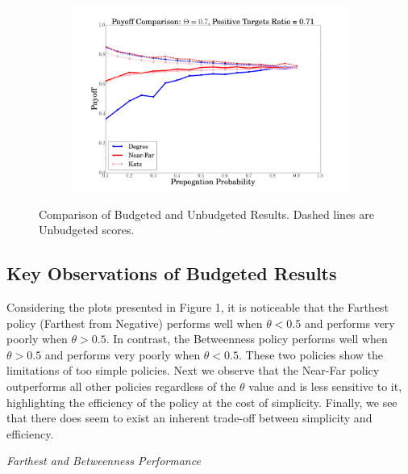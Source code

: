 \begin{figure}
\begin{subfigure}{\linewidth}
  \end{subfigure}\par\medskip
  \begin{subfigure}{\linewidth}
\includegraphics[width=1\textwidth]{../plots/comparison/theta=7.png}
  \end{subfigure}\par\medskip
  \caption{Comparison of Budgeted and Unbudgeted Results. Dashed lines are Unbudgeted scores.}
\end{figure}


\subsection{Key Observations of Budgeted Results}

Considering the plots presented in Figure 1, it is noticeable that the Farthest policy (Farthest from Negative) performs well when $\theta < 0.5$ and performs very poorly when $\theta > 0.5$. In contrast, the Betweenness policy performs well when $\theta > 0.5$ and performs very poorly when $\theta < 0.5$. These two policies show the limitations of too simple policies. Next we observe that the Near-Far policy outperforms all other policies regardless of the $\theta$ value and is less sensitive to it, highlighting the efficiency of the policy at the cost of simplicity. Finally, we see that there does seem to exist an inherent trade-off between simplicity and efficiency.

\textit{Farthest and Betweenness Performance}


